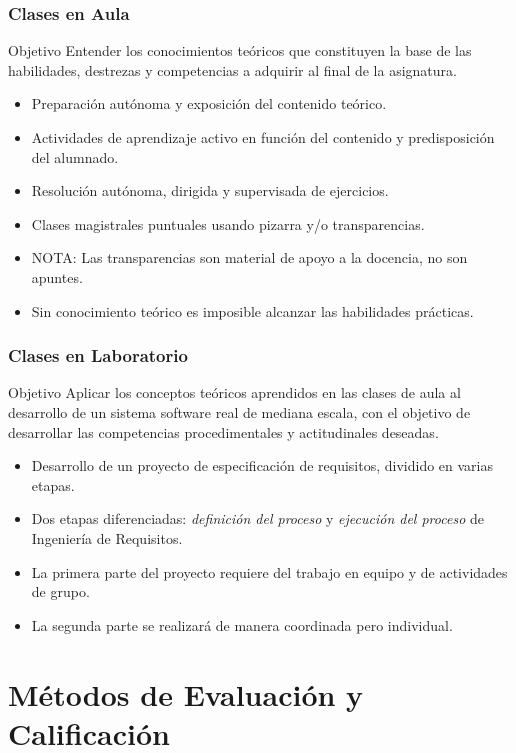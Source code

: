 \documentclass[a4paper,slidestop,xcolor=pst,dvips,blue]{beamer}
\begin{document}
\begin{frame}
	\frametitle{Clases en Aula}
	\begin{block}{Objetivo}
        Entender los conocimientos teóricos que constituyen la base de las habilidades, destrezas y competencias a adquirir al final de la asignatura.
	\end{block}
	\begin{itemize}
        \item<2-> Preparación autónoma y exposición del contenido teórico.
        \item<3-> Actividades de aprendizaje activo en función del contenido y predisposición del alumnado.
		\item<4-> Resolución autónoma, dirigida y supervisada de ejercicios.
		\item<5-> Clases magistrales puntuales usando pizarra y/o transparencias.
		\item<6-> NOTA: \alert{Las transparencias} son material de apoyo a la docencia, \alert{no son apuntes}.
		\item<7-> \alert{Sin conocimiento teórico es imposible alcanzar las habilidades prácticas}.
	\end{itemize}
\end{frame}

\begin{frame}[c]
	\frametitle{Clases en Laboratorio}
	\begin{block}{Objetivo}
		Aplicar los conceptos teóricos aprendidos en las clases de aula al desarrollo de un sistema software real de mediana escala, con el objetivo
        de desarrollar las competencias procedimentales y actitudinales deseadas.
	\end{block}
	\begin{itemize}
        \item<2-> Desarrollo de un proyecto de especificación de requisitos, dividido en varias etapas.
		\item<3-> Dos etapas diferenciadas: \emph{definición del proceso} y \emph{ejecución del proceso} de Ingeniería de Requisitos.
        \item<4-> La primera parte del proyecto requiere del trabajo en equipo y de actividades de grupo.
        \item<5-> La segunda parte se realizará de manera coordinada pero individual.
	\end{itemize}
\end{frame}

\section{Métodos de Evaluación y Calificación}
\end{document}
